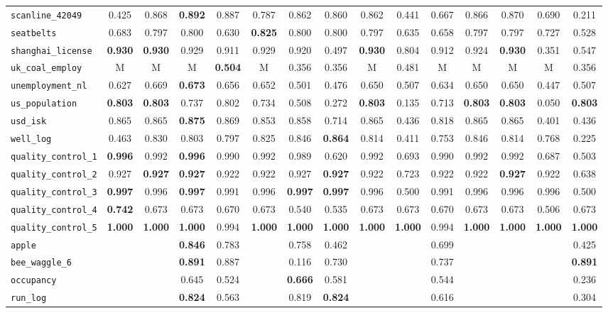 \begin{tabular}{lcccccccccccccc}
\verb+scanline_42049+ & 0.425 & 0.868 & \textbf{0.892} & 0.887 & 0.787 & 0.862 & 0.860 & 0.862 & 0.441 & 0.667 & 0.866 & 0.870 & 0.690 & 0.211\\
\verb+seatbelts+ & 0.683 & 0.797 & 0.800 & 0.630 & \textbf{0.825} & 0.800 & 0.800 & 0.797 & 0.635 & 0.658 & 0.797 & 0.797 & 0.727 & 0.528\\
\verb+shanghai_license+ & \textbf{0.930} & \textbf{0.930} & 0.929 & 0.911 & 0.929 & 0.920 & 0.497 & \textbf{0.930} & 0.804 & 0.912 & 0.924 & \textbf{0.930} & 0.351 & 0.547\\
\verb+uk_coal_employ+ & M & M & M & \textbf{0.504} & M & 0.356 & 0.356 & M & 0.481 & M & M & M & M & 0.356\\
\verb+unemployment_nl+ & 0.627 & 0.669 & \textbf{0.673} & 0.656 & 0.652 & 0.501 & 0.476 & 0.650 & 0.507 & 0.634 & 0.650 & 0.650 & 0.447 & 0.507\\
\verb+us_population+ & \textbf{0.803} & \textbf{0.803} & 0.737 & 0.802 & 0.734 & 0.508 & 0.272 & \textbf{0.803} & 0.135 & 0.713 & \textbf{0.803} & \textbf{0.803} & 0.050 & \textbf{0.803}\\
\verb+usd_isk+ & 0.865 & 0.865 & \textbf{0.875} & 0.869 & 0.853 & 0.858 & 0.714 & 0.865 & 0.436 & 0.818 & 0.865 & 0.865 & 0.401 & 0.436\\
\verb+well_log+ & 0.463 & 0.830 & 0.803 & 0.797 & 0.825 & 0.846 & \textbf{0.864} & 0.814 & 0.411 & 0.753 & 0.846 & 0.814 & 0.768 & 0.225\\
\midrule
\verb+quality_control_1+ & \textbf{0.996} & 0.992 & \textbf{0.996} & 0.990 & 0.992 & 0.989 & 0.620 & 0.992 & 0.693 & 0.990 & 0.992 & 0.992 & 0.687 & 0.503\\
\verb+quality_control_2+ & 0.927 & \textbf{0.927} & \textbf{0.927} & 0.922 & 0.922 & 0.927 & \textbf{0.927} & 0.922 & 0.723 & 0.922 & 0.922 & \textbf{0.927} & 0.922 & 0.638\\
\verb+quality_control_3+ & \textbf{0.997} & 0.996 & \textbf{0.997} & 0.991 & 0.996 & \textbf{0.997} & \textbf{0.997} & 0.996 & 0.500 & 0.991 & 0.996 & 0.996 & 0.996 & 0.500\\
\verb+quality_control_4+ & \textbf{0.742} & 0.673 & 0.673 & 0.670 & 0.673 & 0.540 & 0.535 & 0.673 & 0.673 & 0.670 & 0.673 & 0.673 & 0.506 & 0.673\\
\verb+quality_control_5+ & \textbf{1.000} & \textbf{1.000} & \textbf{1.000} & 0.994 & \textbf{1.000} & \textbf{1.000} & \textbf{1.000} & \textbf{1.000} & \textbf{1.000} & 0.994 & \textbf{1.000} & \textbf{1.000} & \textbf{1.000} & \textbf{1.000}\\
\midrule
\verb+apple+ &  &  & \textbf{0.846} & 0.783 &  & 0.758 & 0.462 &  &  & 0.699 &  &  &  & 0.425\\
\verb+bee_waggle_6+ &  &  & \textbf{0.891} & 0.887 &  & 0.116 & 0.730 &  &  & 0.737 &  &  &  & \textbf{0.891}\\
\verb+occupancy+ &  &  & 0.645 & 0.524 &  & \textbf{0.666} & 0.581 &  &  & 0.544 &  &  &  & 0.236\\
\verb+run_log+ &  &  & \textbf{0.824} & 0.563 &  & 0.819 & \textbf{0.824} &  &  & 0.616 &  &  &  & 0.304\\
\bottomrule
\end{tabular}
